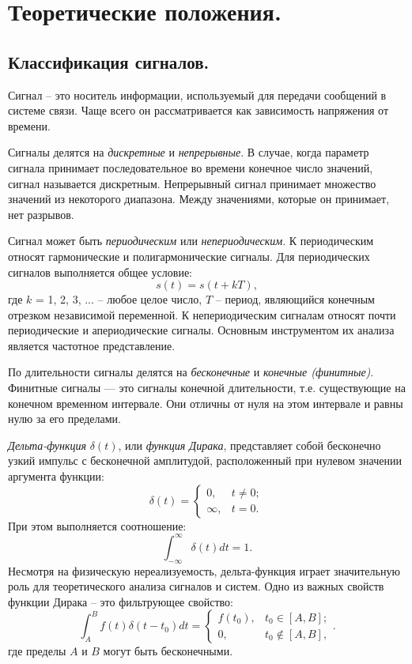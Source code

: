 \documentclass[a4paper,14pt]{extarticle}
\begin{document}
\section{Теоретические положения.}
\subsection{Классификация сигналов.}
Сигнал – это носитель информации, используемый для передачи сообщений в системе связи. Чаще всего он рассматривается как зависимость напряжения от времени.

Сигналы делятся на \textit{дискретные} и \textit{непрерывные}. В случае, когда параметр сигнала принимает последовательное во времени конечное число значений, сигнал называется дискретным. Непрерывный сигнал принимает множество значений из некоторого диапазона. Между значениями, которые он принимает, нет разрывов.

Сигнал может быть \textit{периодическим} или \textit{непериодическим}. К периодическим относят гармонические и полигармонические сигналы. Для периодических сигналов выполняется общее условие:
\begin{equation*}
s(t) = s(t + kT),
\end{equation*}
где $k$ = 1, 2, 3, ... -- любое целое число, $T$ -- период, являющийся конечным отрезком независимой переменной. К непериодическим сигналам относят почти периодические и апериодические сигналы. Основным инструментом их анализа является частотное представление.

По длительности сигналы делятся на \textit{бесконечные} и \textit{конечные (финитные)}. Финитные сигналы — это сигналы конечной длительности, т.е. существующие на конечном временном интервале. Они отличны от нуля на этом интервале и равны нулю за его пределами.

\textit{Дельта-функция} $\delta(t)$, или \textit{функция Дирака}, представляет собой бесконечно узкий импульс с бесконечной амплитудой, расположенный при
нулевом значении аргумента функции:
\begin{equation*}
\delta(t) = \begin{cases} 0, & t \neq 0; \\ \infty, & t = 0. \end{cases}
\end{equation*}
При этом выполняется соотношение:
\begin{equation*}
\int_{-\infty}^\infty \delta(t)dt = 1.
\end{equation*}
Несмотря на физическую нереализуемость, дельта-функция играет значительную роль для теоретического анализа сигналов и систем. Одно из важных свойств функции Дирака -- это фильтрующее свойство:
\begin{equation*}
\int_A^B f(t) \delta(t - t_0) dt = \begin{cases} f(t_0), & t_0 \in [A, B]; \\ 0, & t_0 \notin [A, B], \end{cases}.
\end{equation*}
где пределы $A$ и $B$ могут быть бесконечными.
\end{document}
